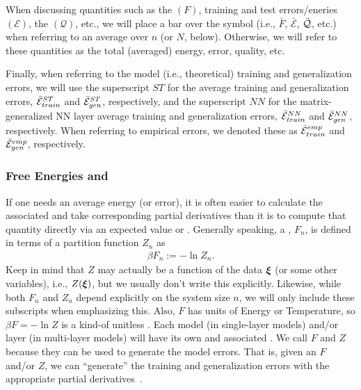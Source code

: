 When discussing quantities such as the \FreeEnergy $(F)$, 
training and test errors/eneries $(\mathcal{E})$, 
the \LayerQuality $(\mathcal{Q})$, etc.,
we will place a bar over the symbol (i.e., $\bar{F}$, $\bar{\mathcal{E}}$, $\bar{\mathcal{Q}}$, etc.) when referring to
an average over $n$ (or $N$, below). 
Otherwise, we will refer to these quantities as the total (averaged) energy, error, quality, etc.


Finally, when referring to the model (i.e., theoretical)
training and generalization errors, we will use the superscript $ST$ for
the average \StudentTeacher training and generalization errors, $\bar{\mathcal{E}}^{ST}_{train}$ and $\bar{\mathcal{E}}^{ST}_{gen}$, respectively, and
the superscript $NN$ for the matrix-generalized NN layer average
training and generalization errors, $\bar{\mathcal{E}}^{NN}_{train}$ and $\bar{\mathcal{E}}^{NN}_{gen}$, respectively.
When referring to empirical errors, we denoted these as $\bar{\mathcal{E}}^{emp}_{train}$ and $\bar{\mathcal{E}}^{emp}_{gen}$, respectively.


\subsubsection{Free Energies and \GeneratingFunctions} 
\label{sxn:mathP_free_energies}


If one needs an average energy (or error), 
it is often easier to calculate the associated \FreeEnergy and take corresponding partial derivatives
than it is to compute that quantity directly via an expected value or \ThermalAverage.
Generally speaking, a \FreeEnergy, $F_n$, is defined in terms of a partition function $Z_{n}$ as
\begin{align}
\label{eqn:F}
\beta F_n:=-\ln Z_{n}.
\end{align}
Keep in mind that $Z$ may actually be a function of the data $\boldsymbol{\xi}$ (or some other variables),
i.e., $Z(\boldsymbol{\xi})$, but we usually don't write this explicitly.
Likewise, while  both $F_n$ and $Z_n$ depend explicitly on the system size $n$,
we will only include these subscripts when emphasizing this.
Also, $F$ has units of Energy or Temperature, so $\beta F=-\ln Z$ is a kind-of unitless \FreeEnergy.
%
Each model (in single-layer models) and/or layer (in multi-layer models) will have its own \PartitionFunction and associated \GeneratingFunctions.
We call $F$ and $Z$ \emph{\GeneratingFunctions} because they can be used to generate the model errors. 
That is, given an $F$ and/or $Z$, we can ``generate'' the training and generalization errors with the appropriate partial derivatives~\cite{LTS90, Solla2023}.

